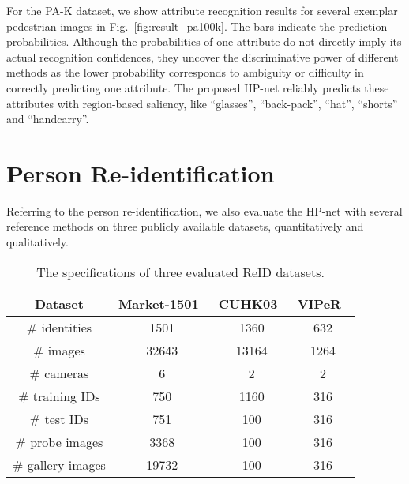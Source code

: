 \documentclass[10pt,twocolumn,letterpaper]{article}
\begin{document}
For the PA-K dataset, we show attribute recognition results for several exemplar pedestrian images in Fig.~\ref{fig:result_pa100k}.
The bars indicate the prediction probabilities.
Although the probabilities of one attribute do not directly imply its actual recognition confidences, they uncover the discriminative power of different methods as the lower probability corresponds to ambiguity or difficulty in correctly predicting one attribute.
The proposed HP-net reliably predicts these attributes with region-based saliency, like ``glasses'', ``back-pack'', ``hat'', ``shorts'' and ``handcarry''.







\section{Person Re-identification}
\label{sec:exp_reid}

Referring to the person re-identification,
we also evaluate the HP-net with several reference methods on three publicly available datasets, quantitatively and qualitatively.

\begin{table}
\begin{center}
\begin{footnotesize}
\begin{tabular}{c|ccc}
\hline
Dataset & Market-1501~\cite{zheng2015scalable} & CUHK03~\cite{li2014deepreid} & VIPeR~\cite{gray2007evaluating} \\\hline
\# identities & 1501 & 1360 & 632\\
\# images & 32643 & 13164 & 1264\\
\# cameras & 6 & 2 & 2\\\hline
\# training IDs & 750 & 1160 & 316\\\hline
\# test IDs & 751 & 100 & 316\\
\# probe images & 3368 & 100 & 316\\
\# gallery images & 19732 & 100 & 316\\\hline
\end{tabular}
\end{footnotesize}
\caption{The specifications of three evaluated ReID datasets.}
\label{tab:datasets}
\vspace{-0.3cm}
\end{center}
\end{table}
\end{document}
